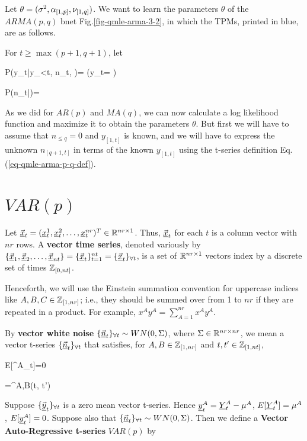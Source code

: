 Let $\theta=(\sigma^2,\alpha_{[1,p]}, \nu_{[1,q]})$.
We want to learn the parameters
$\theta$
of the $ARMA(p,q)$ bnet Fig.\ref{fig-qmle-arma-3-2},
in which the TPMs, printed in blue,
are as follows.

For $t\geq
\max(p+1, q+1)$, let

\beq\color{blue}
P(y_t|y_{<t}, n_{\leq t}, \theta)=
\indi\left(y_t=
\right)
\eeq

\beq\color{blue}
P(n_t|\theta)=
{\s\sqrt{2\pi}}
\exp{}
\eeq


As we did for
$AR(p)$ and $MA(q)$,
we can  now calculate
a log likelihood
function and
maximize it to obtain the
parameters $\theta$.
But first we
will have to assume
that $n_{\leq q}=0$
and $y_{[1,t]}$ is
known,
and we will
have to express
the unknown $n_{[q+1,t]}$
in terms of the known $y_{[1, t]}$
using the t-series definition
Eq.(\ref{eq-qmle-arma-p-q-def}).

\section{$VAR(p)$}
\label{sec-var-p}

Let
$\vec{\rvx}_t=(\rvx_{t}^1,
\rvx_{t}^2, \ldots, \rvx_t^{nr})^T
\in \RR^{nr\times 1}$. Thus,
 $\vec{\rvx}_t$
for each $t$ is a
column vector with $nr$ rows.
A {\bf vector time series}, denoted
variously by
$\{\vec{\rvx}_1, \vec{\rvx}_2, \ldots,
\vec{\rvx}_{nt}\}
=\{\vec{\rvx}_t\}_{t=1}^{nt}
=\tseries{\vec{\rvx}_t}$,
is a set of ${ \mathbb{R}}^{nr\times1}$ vectors
index by a discrete set of times ${\mathbb{Z}}_{[0, nt]}$.


Henceforth, we will use the Einstein
summation convention
for uppercase
indices like $A, B, C\in {\mathbb{Z}}_{[1,nr]}$; i.e.,
they should be summed over
from 1 to $nr$
if they are repeated in a product.
For example, $x^A y^A =\sum_{A=1}^{nr}x^A y^A$.

By {\bf vector white noise}
$\tseries{\vec{\rvn}_t}\sim WN(0, \Sigma)$,
where $\Sigma\in { \mathbb{R}}^{nr\times nr}$,
we mean a vector t-series
$\tseries{\vec{\rvn}_t}$ that satisfies,
for
$A,B\in {\mathbb{Z}}_{[1,nr]}$
and $t,t'\in {\mathbb{Z}}_{[1,nt]}$,


\beq
E[\rvn^A_t]=0
\eeq

\beq
{}=\Sigma^{A,B}\delta(t, t')
\eeq

Suppose $\tseries{\vec{\rvy}_t}$
is a zero mean vector
 t-series.
Hence
$\rvy_t^A= \rvY_t^A-\mu^A$,
$E[\rvY_t^A]=\mu^A$,
$E[\rvy_t^A]=0$.
Suppose also that
$\tseries{\vec{\rvn}_t}\sim WN(0, \Sigma)$.
Then we define a
{\bf Vector
Auto-Regressive
t-series} $VAR(p)$ by

